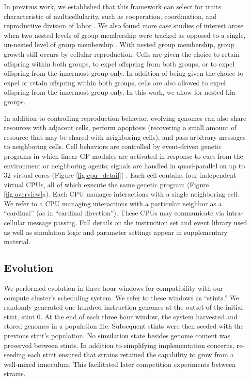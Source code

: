 In previous work, we established that this framework can select for traits characteristic of multicellularity, such as cooperation, coordination, and reproductive division of labor \citep{moreno2021exploring}.
We also found more case studies of interest arose when two nested levels of group membership were tracked
as opposed to a single, un-nested level of group membership \citep{moreno2021exploring}.
With nested group membership, group growth still occurs by cellular reproduction.
Cells are given the choice to retain offspring within both groups, to expel offspring from both groups, or to expel offspring from the innermost group only.
In addition of being given the choice to expel or retain offspring within both groups, cells are also allowed to expel offspring from the innermost group only.
In this work, we allow for nested kin groups.

In addition to controlling reproduction behavior, evolving genomes can also share resources with adjacent cells, perform apoptosis (recovering a small amount of resource that may be shared with neighboring cells), and pass arbitrary messages to neighboring cells.
Cell behaviors are controlled by event-driven genetic programs in which linear GP modules are activated in response to cues from the environment or neighboring agents; signals are handled in quasi-parallel on up to 32 virtual cores (Figure \ref{fig:cpu_detail}) \citep{lalejini2018evolving}.
Each cell contains four independent virtual CPUs, all of which execute the same genetic program (Figure \ref{fig:overview}a).
Each CPU manages interactions with a single neighboring cell.
We refer to a CPU managing interactions with a particular neighbor as a ``cardinal'' (as in ``cardinal direction'').
These CPUs may communicate via intra-cellular message passing.
Full details on the instruction set and event library used as well as simulation logic and parameter settings appear in supplementary material.

\subsection{Evolution}
\label{sec:evolution;ch:measuring-cna}

We performed evolution in three-hour windows for compatibility with our compute cluster's scheduling system.
We refer to these windows as ``stints.''
We randomly generated one-hundred instruction genomes at the outset of the initial stint, stint 0.
At the end of each three hour window, the system harvested and stored genomes in a population file.
Subsequent stints were then seeded with the previous stint's population.
No simulation state besides genome content was preserved between stints.
In addition to simplifying implementation concerns, re-seeding each stint ensured that strains retained the capability to grow from a well-mixed innoculum.
This facilitated later competition experiments between strains.

